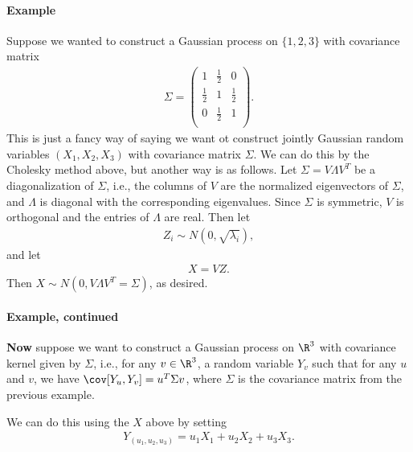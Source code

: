 \paragraph{Example} 
    Suppose we wanted to construct a Gaussian process on $\{1,2,3\}$ with covariance matrix 
        $$\begin{aligned}
            \Sigma=
                \left(\begin{array}{ccc}
                1 & \frac{1}{2} & 0\\
                \frac{1}{2} & 1 & \frac{1}{2}\\
                0 & \frac{1}{2} & 1\\
                \end{array}\right).
        \end{aligned}$$
        This is just a fancy way of saying we want ot construct jointly Gaussian random variables $(X_1, X_2, X_3)$
        with covariance matrix $\Sigma$.
        We can do this by the Cholesky method above,
        but another way is as follows.
        Let $\Sigma = V \Lambda V^T$ be a diagonalization of $\Sigma$,
        i.e., the columns of $V$ are the normalized eigenvectors of $\Sigma$,
        and $\Lambda$ is diagonal with the corresponding eigenvalues.
        Since $\Sigma$ is symmetric, $V$ is orthogonal and the entries of $\Lambda$ are real.
        Then let
        $$\begin{aligned}
            Z_i \sim N(0, \sqrt{\lambda_i}),
        \end{aligned}$$
        and let 
        $$\begin{aligned}
            X = V Z.
        \end{aligned}$$
        Then $X \sim N(0, V \Lambda V^T = \Sigma)$, as desired.


\paragraph{Example, continued}

        \textbf{Now} suppose we want to construct a Gaussian process on $\R^3$ with covariance kernel given by $\Sigma$,
        i.e., for any $v \in \R^3$, a random variable $Y_v$
        such that for any $u$ and $v$, we have $\cov[Y_u,Y_v]=u^T \Sigma v$,
        where $\Sigma$ is the covariance matrix from the previous example.

        We can do this using the $X$ above
        by setting
        $$\begin{aligned}
            Y_{(u_1, u_2, u_3)} = u_1 X_1 + u_2 X_2 + u_3 X_3 .
        \end{aligned}$$


